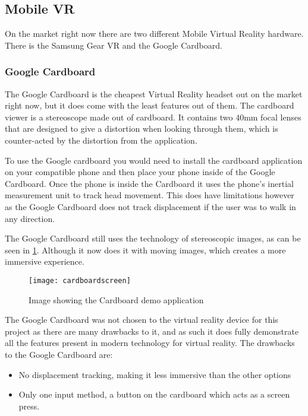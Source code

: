 \subsection{Mobile VR}
On the market right now there are two different Mobile Virtual Reality hardware. There is the Samsung Gear VR and the Google Cardboard.

\subsubsection{Google Cardboard}
The Google Cardboard is the cheapest Virtual Reality headset out on the market right now, but it does come with the least features out of them. The cardboard viewer is a stereoscope made out of cardboard. It contains two 40mm focal lenses that are designed to give a distortion when looking through them, which is counter-acted by the distortion from the application\cite{cardboarddev}.
\newline
\par
To use the Google cardboard you would need to install the cardboard application on your compatible phone and then place your phone inside of the Google Cardboard. Once the phone is inside the Cardboard it uses the phone's inertial measurement unit to track head movement. This does have limitations however as the Google Cardboard does not track displacement if the user was to walk in any direction.
\newline
\par
The Google Cardboard still uses the technology of stereoscopic images, as can be seen in \ref{fig:cardboard1}. Although it now does it with moving images, which creates a more immersive experience. \\

\begin{figure}[H]
	\texttt{[image: cardboardscreen]}
	\centering
	\caption{Image showing the Cardboard demo application}
	\label{fig:cardboard1}
\end{figure}

The Google Cardboard was not chosen to the virtual reality device for this project as there are many drawbacks to it, and as such it does fully demonstrate all the features present in modern technology for virtual reality. The drawbacks to the Google Cardboard are:

\begin{itemize}
	\item No displacement tracking, making it less immersive than the other options
	\item Only one input method, a button on the cardboard which acts as a screen press.
\end{itemize}

